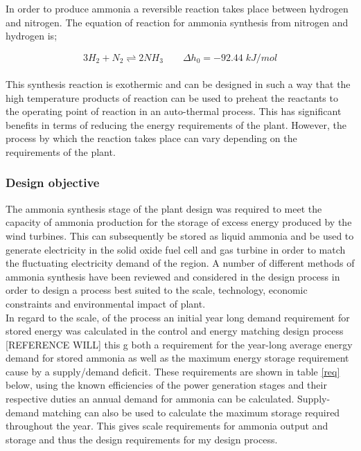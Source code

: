 In order to produce ammonia a reversible reaction takes place between hydrogen and nitrogen. The equation of reaction for ammonia synthesis from nitrogen and hydrogen is;

\begin{equation}
3H_2+N_2   \underset{ }{\stackrel{ }{\rightleftharpoons}}   2NH_3 \qquad \Delta h_0 = -92.44 \; kJ/mol 
\end{equation}

This synthesis reaction is exothermic and can be designed in such a way that the high temperature products of reaction can be used to preheat the reactants to the operating point of reaction in an auto-thermal process. This has significant benefits in terms of reducing the energy requirements of the plant. However, the process by which the reaction takes place can vary depending on the requirements of the plant.

\subsubsection{Design objective}
The ammonia synthesis stage of the plant design was required to meet the capacity of ammonia production for the storage of excess energy produced by the wind turbines. This can subsequently be stored as liquid ammonia and be used to generate electricity in the solid oxide fuel cell and gas turbine in order to match the fluctuating electricity demand of the region. A number of different methods of ammonia synthesis have been reviewed and considered in the design process in order to design a process best suited to the scale, technology, economic constraints and environmental impact of plant. 
\\
In regard to the scale, of the process an initial year long demand requirement for stored energy was calculated in the control and energy matching design process [REFERENCE WILL] this g both a requirement for the year-long average energy demand for stored ammonia as well as the maximum energy storage requirement cause by a supply/demand deficit. 
These requirements are shown in table \ref{req} below, using the known efficiencies of the power generation stages and their respective duties an annual demand for ammonia can be calculated. Supply-demand matching can also be used to calculate the maximum storage required throughout the year. This gives scale requirements for ammonia output and storage and thus the design requirements for my design process. 

